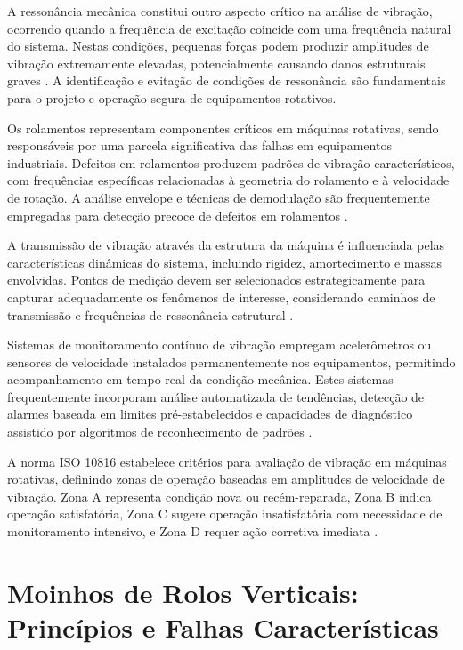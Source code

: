 A ressonância mecânica constitui outro aspecto crítico na análise de vibração, ocorrendo quando a frequência de excitação coincide com uma frequência natural do sistema. Nestas condições, pequenas forças podem produzir amplitudes de vibração extremamente elevadas, potencialmente causando danos estruturais graves \cite{inman2014engineering}. A identificação e evitação de condições de ressonância são fundamentais para o projeto e operação segura de equipamentos rotativos.

Os rolamentos representam componentes críticos em máquinas rotativas, sendo responsáveis por uma parcela significativa das falhas em equipamentos industriais. Defeitos em rolamentos produzem padrões de vibração característicos, com frequências específicas relacionadas à geometria do rolamento e à velocidade de rotação. A análise envelope e técnicas de demodulação são frequentemente empregadas para detecção precoce de defeitos em rolamentos \cite{randall2011rolling}.

A transmissão de vibração através da estrutura da máquina é influenciada pelas características dinâmicas do sistema, incluindo rigidez, amortecimento e massas envolvidas. Pontos de medição devem ser selecionados estrategicamente para capturar adequadamente os fenômenos de interesse, considerando caminhos de transmissão e frequências de ressonância estrutural \cite{scheffer2004machinery}.

Sistemas de monitoramento contínuo de vibração empregam acelerômetros ou sensores de velocidade instalados permanentemente nos equipamentos, permitindo acompanhamento em tempo real da condição mecânica. Estes sistemas frequentemente incorporam análise automatizada de tendências, detecção de alarmes baseada em limites pré-estabelecidos e capacidades de diagnóstico assistido por algoritmos de reconhecimento de padrões \cite{jardine2006review}.

A norma ISO 10816 estabelece critérios para avaliação de vibração em máquinas rotativas, definindo zonas de operação baseadas em amplitudes de velocidade de vibração. Zona A representa condição nova ou recém-reparada, Zona B indica operação satisfatória, Zona C sugere operação insatisfatória com necessidade de monitoramento intensivo, e Zona D requer ação corretiva imediata \cite{iso10816}.

\section{Moinhos de Rolos Verticais: Princípios e Falhas Características}
\label{sec:moinhos-rolos}

